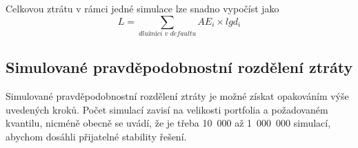 Celkovou ztrátu v rámci jedné simulace lze snadno vypočíst jako
\begin{equation*}
L = \sum_{\textit{dlužníci v defaultu}} AE_i \times lgd_i
\end{equation*}

\subsection{Simulované pravděpodobnostní rozdělení ztráty}

Simulované pravděpodobnostní rozdělení ztráty je možné získat opakováním výše uvedených kroků. Počet simulací zavisí na velikosti portfolia a požadovaném kvantilu, nicméně obecně se uvádí, že je třeba 10~000 až 1~000~000 simulací, abychom dosáhli přijatelné stability řešení.
